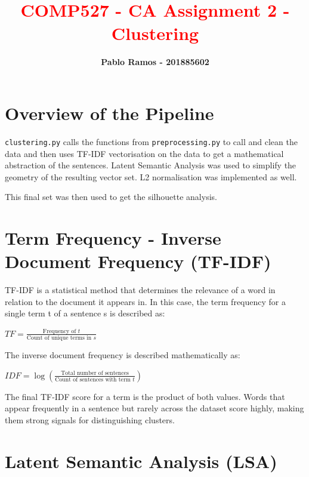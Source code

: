 \documentclass[11pt]{article}
\title{\textcolor{Red}{\textbf{COMP527 - CA Assignment 2 - Clustering}}}
\author{\textbf{Pablo Ramos - 201885602}}
\begin{document}
%
%
\maketitle
{\setlength{\parindent}{0mm}{\color{Black} \rule{\linewidth}{0.5mm}}} %

\section{Overview of the Pipeline}

\texttt{clustering.py} calls the functions from \texttt{preprocessing.py} to call and clean the data and then uses TF-IDF vectorisation on the data to get a mathematical abstraction of the sentences. Latent Semantic Analysis was used to simplify the geometry of the resulting vector set. L2 normalisation was implemented as well.

This final set was then used to get the silhouette analysis.

\section{Term Frequency - Inverse Document Frequency (TF-IDF)}

TF-IDF is a statistical method that determines the relevance of a word in relation to the document it appears in. In this case, the term frequency for a single term t of a sentence s is described as:

\begin{center}
  $TF=\frac{\text{Frequency of }t}{\text{Count of unique terms in }s}$
\end{center}

{\setlength{\parindent}{0mm}The inverse document frequency is described mathematically as:}

\begin{center}
  $IDF=\log\left(\frac{\text{Total number of sentences}}{\text{Count of sentences with term }t}\right)$
\end{center}

{\setlength{\parindent}{0mm}The final TF-IDF score for a term is the product of both values. Words that appear frequently in a sentence but rarely across the dataset score highly, making them strong signals for distinguishing clusters.}

\section{Latent Semantic Analysis (LSA)}
\end{document}
